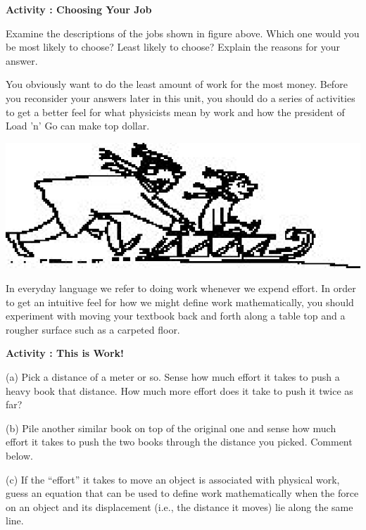 \textbf{Activity  : Choosing Your Job }

Examine the descriptions of the jobs shown in figure above. Which one would
you be most likely to choose? Least likely to choose? Explain the reasons for
your answer.
\vspace{30mm}

You obviously want to do the least amount of work for the most money. Before
you reconsider your answers later in this unit, you should do a series of activities
to get a better feel for what physicists mean by work and how the president
of Load 'n' Go can make top dollar.

\vspace{0.3cm}
{\par\centering \includegraphics{workAndKE/work_power_fig2.eps} \par}
\vspace{0.3cm}

In everyday language we refer to doing work whenever we expend effort. In order
to get an intuitive feel for how we might define work mathematically, you should
experiment with moving your textbook back and forth along a table top and a
rougher surface such as a carpeted floor.

\textbf{Activity  : This is Work!} 

(a) Pick a distance of a meter or so. Sense how much effort it takes to push
a heavy book that distance. How much more effort does it take to push it twice
as far? 
\vspace{20mm}

(b) Pile another similar book on top of the original one and sense how much
effort it takes to push the two books through the distance you picked. Comment
below.
\vspace{20mm}

(c) If the ``effort'' it takes to move an object is associated
with physical work, guess an equation that can be used to define work mathematically
when the force on an object and its displacement (i.e., the distance it moves)
lie along the same line.
\vspace{20mm}

